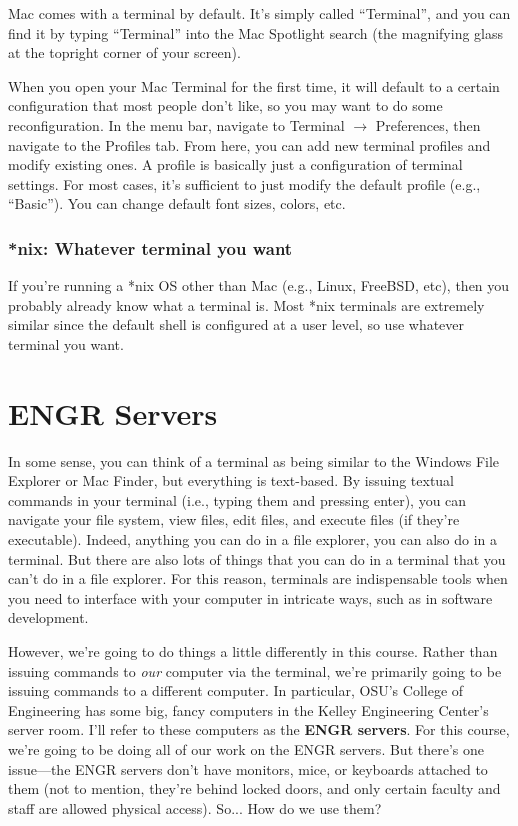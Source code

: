 \documentclass{article}
\begin{document}
Mac comes with a terminal by default. It's simply called ``Terminal'', and you can find it by typing ``Terminal'' into the Mac Spotlight search (the magnifying glass at the topright corner of your screen).

When you open your Mac Terminal for the first time, it will default to a certain configuration that most people don't like, so you may want to do some reconfiguration. In the menu bar, navigate to Terminal $\rightarrow$ Preferences, then navigate to the Profiles tab. From here, you can add new terminal profiles and modify existing ones. A profile is basically just a configuration of terminal settings. For most cases, it's sufficient to just modify the default profile (e.g., ``Basic''). You can change default font sizes, colors, etc.

\subsubsection{*nix: Whatever terminal you want}

If you're running a *nix OS other than Mac (e.g., Linux, FreeBSD, etc), then you probably already know what a terminal is. Most *nix terminals are extremely similar since the default shell is configured at a user level, so use whatever terminal you want.

\section{ENGR Servers}

In some sense, you can think of a terminal as being similar to the Windows File Explorer or Mac Finder, but everything is text-based. By issuing textual commands in your terminal (i.e., typing them and pressing enter), you can navigate your file system, view files, edit files, and execute files (if they're executable). Indeed, anything you can do in a file explorer, you can also do in a terminal. But there are also lots of things that you can do in a terminal that you can't do in a file explorer. For this reason, terminals are indispensable tools when you need to interface with your computer in intricate ways, such as in software development.

However, we're going to do things a little differently in this course. Rather than issuing commands to \textit{our} computer via the terminal, we're primarily going to be issuing commands to a different computer. In particular, OSU's College of Engineering has some big, fancy computers in the Kelley Engineering Center's server room. I'll refer to these computers as the \textbf{ENGR servers}. For this course, we're going to be doing all of our work on the ENGR servers. But there's one issue---the ENGR servers don't have monitors, mice, or keyboards attached to them (not to mention, they're behind locked doors, and only certain faculty and staff are allowed physical access). So... How do we use them?
\end{document}
